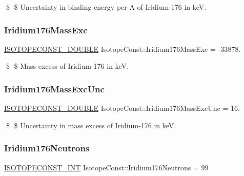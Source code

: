 \$ \$ Uncertainty in binding energy per A of Iridium-\/176 in keV. \mbox{\label{group___isotope_const-_iridium-_ir176_ga4fab23d501c8fc47361543f431179d97}} 
\subsubsection{\texorpdfstring{Iridium176\+Mass\+Exc}{Iridium176MassExc}}
{\footnotesize\ttfamily \mbox{\hyperlink{group___isotope_const-_macros_ga8f45a7272ce02c0b4c65c44636ed719a}{I\+S\+O\+T\+O\+P\+E\+C\+O\+N\+S\+T\+\_\+\+D\+O\+U\+B\+LE}} Isotope\+Const\+::\+Iridium176\+Mass\+Exc = -\/33878.}

\$ \$ Mass excess of Iridium-\/176 in keV. \mbox{\label{group___isotope_const-_iridium-_ir176_ga343b2a22df58ff80d1c478f3c8fa8f5f}} 
\subsubsection{\texorpdfstring{Iridium176\+Mass\+Exc\+Unc}{Iridium176MassExcUnc}}
{\footnotesize\ttfamily \mbox{\hyperlink{group___isotope_const-_macros_ga8f45a7272ce02c0b4c65c44636ed719a}{I\+S\+O\+T\+O\+P\+E\+C\+O\+N\+S\+T\+\_\+\+D\+O\+U\+B\+LE}} Isotope\+Const\+::\+Iridium176\+Mass\+Exc\+Unc = 16.}

\$ \$ Uncertainty in mass excess of Iridium-\/176 in keV. \mbox{\label{group___isotope_const-_iridium-_ir176_gacdc1cf54591f6f950c6f6819e3749c87}} 
\subsubsection{\texorpdfstring{Iridium176\+Neutrons}{Iridium176Neutrons}}
{\footnotesize\ttfamily \mbox{\hyperlink{group___isotope_const-_macros_ga5f18360b3e99483a35c32d789e62621c}{I\+S\+O\+T\+O\+P\+E\+C\+O\+N\+S\+T\+\_\+\+I\+NT}} Isotope\+Const\+::\+Iridium176\+Neutrons = 99}

